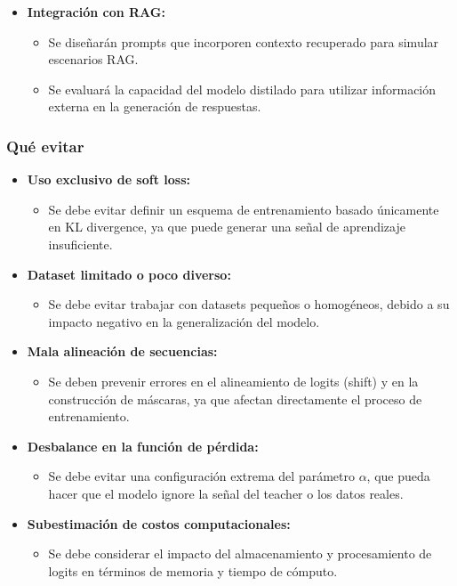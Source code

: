 \documentclass[12pt]{article}
\begin{document}
\begin{itemize}
		\item \textbf{Integración con RAG:}
		\begin{itemize}
			\item Se diseñarán prompts que incorporen contexto recuperado para simular escenarios RAG.
			\item Se evaluará la capacidad del modelo distilado para utilizar información externa en la generación de respuestas.
		\end{itemize}
	\end{itemize}
	
	\subsubsection{Qué evitar}
	
	\begin{itemize}
		\item \textbf{Uso exclusivo de soft loss:}
		\begin{itemize}
			\item Se debe evitar definir un esquema de entrenamiento basado únicamente en KL divergence, ya que puede generar una señal de aprendizaje insuficiente.
		\end{itemize}
		
		\item \textbf{Dataset limitado o poco diverso:}
		\begin{itemize}
			\item Se debe evitar trabajar con datasets pequeños o homogéneos, debido a su impacto negativo en la generalización del modelo.
		\end{itemize}
		
		\item \textbf{Mala alineación de secuencias:}
		\begin{itemize}
			\item Se deben prevenir errores en el alineamiento de logits (shift) y en la construcción de máscaras, ya que afectan directamente el proceso de entrenamiento.
		\end{itemize}
		
		\item \textbf{Desbalance en la función de pérdida:}
		\begin{itemize}
			\item Se debe evitar una configuración extrema del parámetro $\alpha$, que pueda hacer que el modelo ignore la señal del teacher o los datos reales.
		\end{itemize}
		
		\item \textbf{Subestimación de costos computacionales:}
		\begin{itemize}
			\item Se debe considerar el impacto del almacenamiento y procesamiento de logits en términos de memoria y tiempo de cómputo.
		\end{itemize}
	\end{itemize}
	
\end{document}
